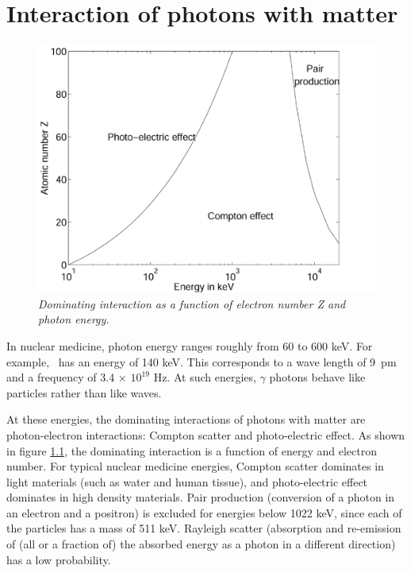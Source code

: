 \chapter{Interaction of photons with matter}

\begin{figure}[tb]
\centering
\includegraphics[width = \figone]{figs/fig_foto_compton_pair.pdf}
\caption{\label{fig:foto_compton_pair} \emph{Dominating interaction as a
function of electron number Z and photon energy.}}
\end{figure}

In nuclear medicine, photon energy ranges roughly from 60 to 600 keV. For
example, \Tc\ has an energy of 140 keV. This corresponds to a wave
length of 9~pm and a frequency of 3.4 $\times$ $10^{19}$ Hz. At such energies,
$\gamma$ photons behave like particles rather than like waves.

At these energies, the dominating interactions of photons with matter are
photon-electron interactions: Compton scatter and photo-electric effect. As
shown in figure \ref{fig:foto_compton_pair}, the dominating interaction is a
function of energy and electron number. For typical nuclear medicine
energies, Compton scatter dominates in light materials (such as water and
human tissue), and photo-electric effect dominates in high density materials.
Pair production (conversion of a photon in an electron and a positron) is
excluded for energies below 1022 keV, since each of the particles has a mass
of 511 keV. Rayleigh scatter (absorption and re-emission of (all or a
fraction of) the absorbed energy as a photon in a different direction) has a
low probability.

